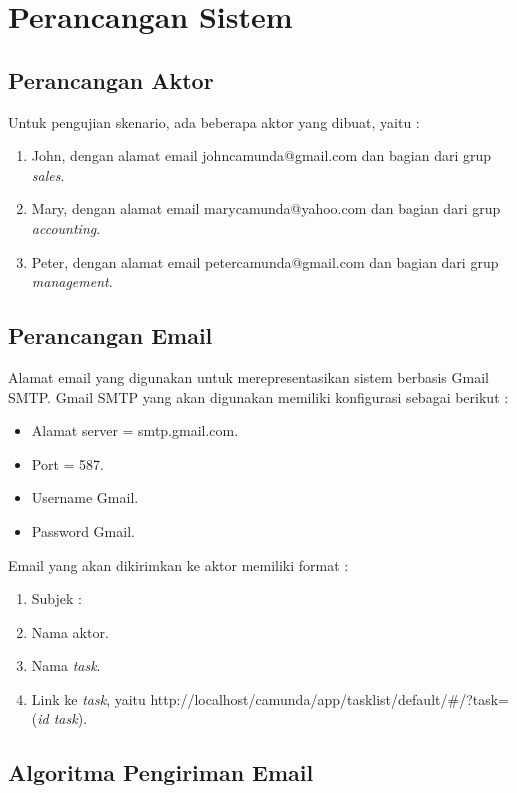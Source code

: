 \section{Perancangan Sistem}
\label{sec:analisisdanperancangan_perancangansistem}


\subsection{Perancangan Aktor}
\label{perancangansistem_perancanganaktor}
Untuk pengujian skenario, ada beberapa aktor yang dibuat, yaitu :
\begin{enumerate}
	\item John, dengan alamat email johncamunda@gmail.com dan bagian dari grup \textit{sales}.
	\item Mary, dengan alamat email marycamunda@yahoo.com dan bagian dari grup \textit{accounting}.
	\item Peter, dengan alamat email petercamunda@gmail.com dan bagian dari grup \textit{management}.
\end{enumerate}





\subsection{Perancangan Email}
\label{perancangansistem_perancanganemail}

Alamat email yang digunakan untuk merepresentasikan sistem berbasis Gmail SMTP. Gmail SMTP yang akan digunakan memiliki konfigurasi sebagai berikut \cite{smtpgoogle} :
\begin{itemize}
	\item Alamat server = smtp.gmail.com.
	\item Port = 587.
	\item Username Gmail.
	\item Password Gmail.
\end{itemize}
Email yang akan dikirimkan ke aktor memiliki format :
\begin{enumerate}
	\item Subjek :
	\item Nama aktor.
	\item Nama \textit{task}.
	\item Link ke \textit{task}, yaitu http://localhost/camunda/app/tasklist/default/\#/?task=(\textit{id task}).
\end{enumerate} 

\subsection{Algoritma Pengiriman Email}
\label{sec:perancangansistem_algoritma}

